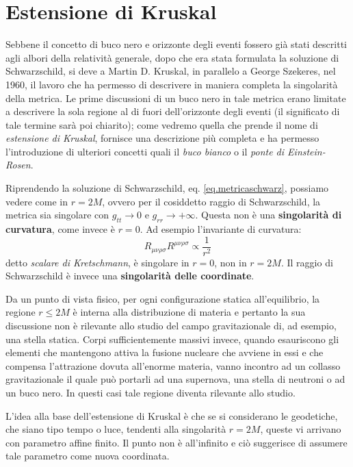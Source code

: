 \section{Estensione di Kruskal}\label{para.kruskal}
Sebbene il concetto di buco nero e orizzonte degli eventi fossero già stati descritti agli albori della relatività generale, dopo che era stata formulata la soluzione di Schwarzschild, si deve a Martin D. Kruskal, in parallelo a George Szekeres, nel 1960, il lavoro che ha permesso di descrivere in maniera completa la singolarità della metrica.
Le prime discussioni di un buco nero in tale metrica erano limitate a descrivere la sola regione al di fuori dell'orizzonte degli eventi (il significato di tale termine sarà poi chiarito); come vedremo quella che prende il nome di \emph{estensione di Kruskal}, fornisce una descrizione più completa e ha permesso l'introduzione di ulteriori concetti quali il \emph{buco bianco} o il \emph{ponte di Einstein-Rosen}.

Riprendendo la soluzione di Schwarzschild, eq. \ref{eq.metricaschwarz}, possiamo vedere come in $r= 2M$, ovvero per il cosiddetto raggio di Schwarzschild, la metrica sia singolare con $g_{tt}\rightarrow 0$ e $g_{rr}\rightarrow+\infty$. Questa non è una \textbf{singolarità di curvatura}, come invece è $r=0$. Ad esempio l'invariante di curvatura:
\begin{equation*}
    R_{\mu\nu\rho\sigma} R^{\mu\nu\rho\sigma} \propto \frac{1}{r^2}
\end{equation*}
detto \emph{scalare di Kretschmann}, è singolare in $r=0$, non in $r=2M$. Il raggio di Schwarzschild è invece una \textbf{singolarità delle coordinate}.

Da un punto di vista fisico, per ogni configurazione statica all'equilibrio, la regione $r\leq 2M$ è interna alla distribuzione di materia e pertanto la sua discussione non è rilevante allo studio del campo gravitazionale di, ad esempio, una stella statica.  Corpi sufficientemente massivi invece, quando esauriscono gli elementi che mantengono attiva la fusione nucleare che avviene in essi e che compensa l'attrazione dovuta all'enorme materia, vanno incontro ad un collasso gravitazionale il quale può portarli ad una supernova, una stella di neutroni o ad un buco nero. In questi casi tale regione diventa rilevante allo studio.

L'idea alla base dell'estensione di Kruskal è che se si considerano le geodetiche, che siano tipo tempo o luce, tendenti alla singolarità $r=2M$, queste vi arrivano con parametro affine finito. Il punto non è all'infinito e ciò suggerisce di assumere tale parametro come nuova coordinata.

